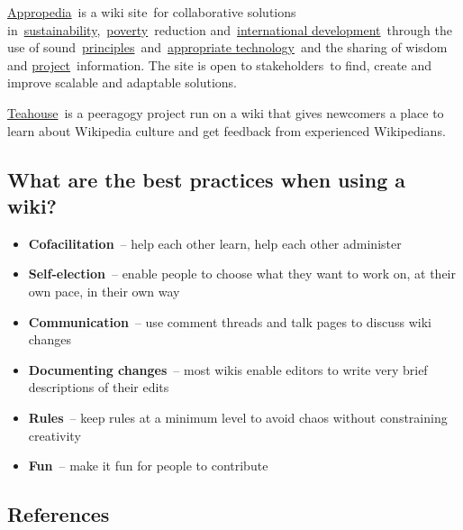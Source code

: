 \href{http://www.appropedia.org/Welcome_to_Appropedia}{Appropedia}~is a
wiki site~for collaborative solutions
in~\href{http://www.appropedia.org/Sustainability}{sustainability},~\href{http://www.appropedia.org/Poverty}{poverty}~reduction
and~\href{http://www.appropedia.org/International_development}{international
development}~through the use of
sound~\href{http://www.appropedia.org/Principles}{principles}~and~\href{http://www.appropedia.org/Appropriate_technology}{appropriate
technology}~and the sharing of wisdom and
\href{http://www.appropedia.org/Project}{project}~information. The site
is open to stakeholders~to find, create and improve scalable and
adaptable solutions.

\href{http://en.wikipedia.org/wiki/Wikipedia:Teahouse}{Teahouse}~is a
peeragogy project run on a wiki that gives newcomers a place to learn
about Wikipedia culture and get feedback from experienced Wikipedians.

\subsection{What are the best practices when using a wiki?}

\begin{itemize}
\itemsep1pt\parskip0pt
\item
  \textbf{Cofacilitation}~-- help each other learn, help each other
  administer
\item
  \textbf{Self-election}~-- enable people to choose what they want to
  work on, at their own pace, in their own way
\item
  \textbf{Communication}~-- use comment threads and talk pages to
  discuss wiki changes
\item
  \textbf{Documenting changes}~-- most wikis enable editors to write
  very brief descriptions of their edits
\item
  \textbf{Rules}~-- keep rules at a minimum level to avoid chaos without
  constraining creativity
\item
  \textbf{Fun}~-- make it fun for people to contribute
\end{itemize}

\subsection{References}

